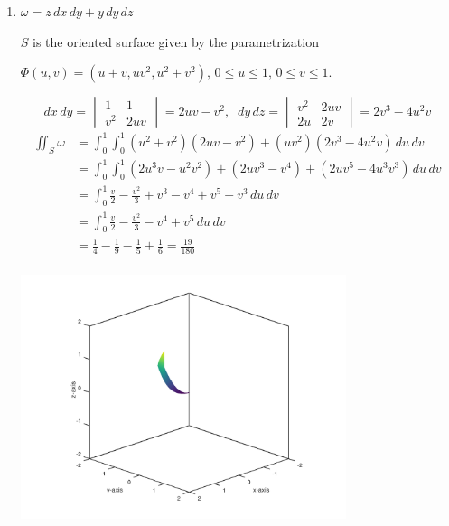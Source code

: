 \documentclass{article}
\begin{document}
\begin{enumerate}
\begin{enumerate}
        \newpage
        \item $\omega = z \, dx \, dy + y \, dy \, dz$
        
        $S$ is the oriented surface given by the parametrization

        $\Phi (u,v) = (u+v, uv^2, u^2 + v^2),\, 0 \leq u \leq 1,\, 0\leq v \leq 1$.

            \[dx \, dy 
            = \begin{vmatrix} 1 & 1 \\ v^2 & 2uv \end{vmatrix} 
            = 2uv - v^2 ,\; \; dy \, dz 
            = \begin{vmatrix} v^2 & 2uv \\ 2u & 2v \end{vmatrix} 
            = 2v^3 - 4 u^2v \]
        \begin{align*}
            \iint_S \omega &= \int_0^1 \int_0^1 (u^2 + v^2)(2uv - v^2) 
            + (uv^2)(2v^3 - 4u^2v) \, du \, dv \\
            &= \int_0^1 \int_0^1 (2u^3v - u^2v^2) + (2uv^3 - v^4) 
            + (2uv^5 - 4u^3v^3) \, du \, dv \\
            &= \int_0^1 \frac{v}{2} - \frac{v^2}{3} + v^3 - v^4 
            + v^5 - v^3 \, du \, dv \\
            &= \int_0^1 \frac{v}{2} - \frac{v^2}{3} - v^4 + v^5 \, du \, dv \\
            &= \frac{1}{4} - \frac{1}{9} - \frac{1}{5} + \frac{1}{6}  
            = \frac{19}{180} \\
        \end{align*}

        \includegraphics[width=0.75\textwidth,center]{b42-a10-5d}
    \end{enumerate}


\end{enumerate}
\end{document}
